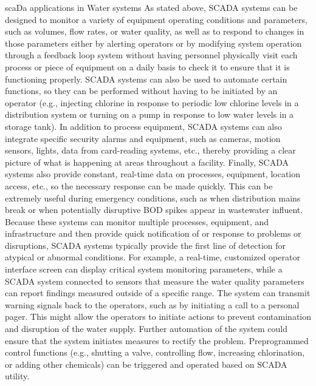 \documentclass{article}
\begin{document}
scaDa applications in Water systems As stated above, SCADA systems can
be designed to monitor a variety of equipment operating conditions and
parameters, such as volumes, flow rates, or water quality, as well as to
respond to changes in those parameters either by alerting operators or
by modifying system operation through a feedback loop system without
having personnel physically visit each process or piece of equipment on
a daily basis to check it to ensure that it is functioning properly.
SCADA systems can also be used to automate certain functions, so they
can be performed without having to be initiated by an operator (e.g.,
injecting chlorine in response to periodic low chlorine levels in a
distribution system or turning on a pump in response to low water levels
in a storage tank). In addition to process equipment, SCADA systems can
also integrate specific security alarms and equipment, such as cameras,
motion sensors, lights, data from card-reading systems, etc., thereby
providing a clear picture of what is happening at areas throughout a
facility. Finally, SCADA systems also provide constant, real-time data
on processes, equipment, location access, etc., so the necessary
response can be made quickly. This can be extremely useful during
emergency conditions, such as when distribution mains break or when
potentially disruptive BOD spikes appear in wastewater influent. Because
these systems can monitor multiple processes, equipment, and
infrastructure and then provide quick notification of or response to
problems or disruptions, SCADA systems typically provide the first line
of detection for atypical or abnormal conditions. For example, a
real-time, customized operator interface screen can display critical
system monitoring parameters, while a SCADA system connected to sensors
that measure the water quality parameters can report findings measured
outside of a specific range. The system can transmit warning signals
back to the operators, such as by initiating a call to a personal pager.
This might allow the operators to initiate actions to prevent
contamination and disruption of the water supply. Further automation of
the system could ensure that the system initiates measures to rectify
the problem. Preprogrammed control functions (e.g., shutting a valve,
controlling flow, increasing chlorination, or adding other chemicals)
can be triggered and operated based on SCADA utility.
\end{document}
